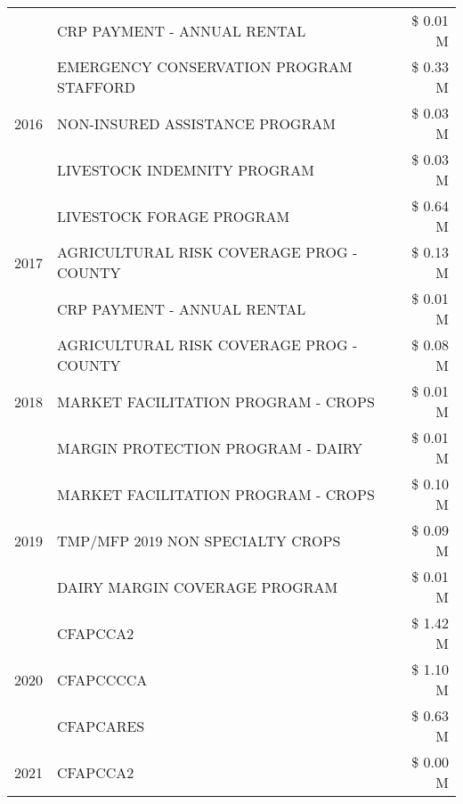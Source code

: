 \begin{tabular}{llr}
 & CRP PAYMENT - ANNUAL RENTAL & \$ 0.01 M \\
\cline{1-3}
\multirow[t]{3}{*}{2016} & EMERGENCY CONSERVATION PROGRAM STAFFORD & \$ 0.33 M \\
 & NON-INSURED ASSISTANCE PROGRAM & \$ 0.03 M \\
 & LIVESTOCK INDEMNITY PROGRAM & \$ 0.03 M \\
\cline{1-3}
\multirow[t]{3}{*}{2017} & LIVESTOCK FORAGE PROGRAM & \$ 0.64 M \\
 & AGRICULTURAL RISK COVERAGE PROG - COUNTY & \$ 0.13 M \\
 & CRP PAYMENT - ANNUAL RENTAL & \$ 0.01 M \\
\cline{1-3}
\multirow[t]{3}{*}{2018} & AGRICULTURAL RISK COVERAGE PROG - COUNTY & \$ 0.08 M \\
 & MARKET FACILITATION PROGRAM - CROPS & \$ 0.01 M \\
 & MARGIN PROTECTION PROGRAM - DAIRY & \$ 0.01 M \\
\cline{1-3}
\multirow[t]{3}{*}{2019} & MARKET FACILITATION PROGRAM - CROPS & \$ 0.10 M \\
 & TMP/MFP 2019 NON SPECIALTY CROPS & \$ 0.09 M \\
 & DAIRY MARGIN COVERAGE PROGRAM & \$ 0.01 M \\
\cline{1-3}
\multirow[t]{3}{*}{2020} & CFAPCCA2 & \$ 1.42 M \\
 & CFAPCCCCA & \$ 1.10 M \\
 & CFAPCARES & \$ 0.63 M \\
\cline{1-3}
2021 & CFAPCCA2 & \$ 0.00 M \\
\cline{1-3}
\bottomrule
\end{tabular}

